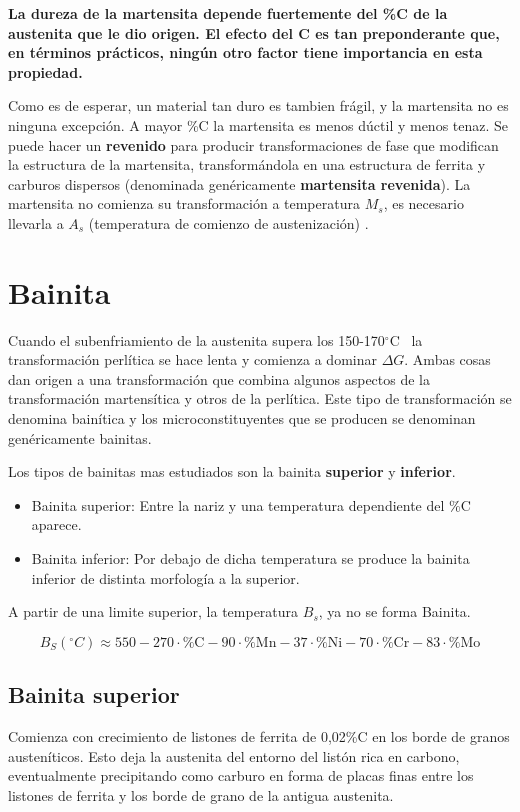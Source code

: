 \documentclass{article}
\newcommand{\grad}{\ensuremath{^\circ \mathrm{C}}}
\begin{document}
\textbf{La dureza de la martensita depende fuertemente del \%C de la austenita que le dio origen. El efecto del C es tan preponderante que, en términos prácticos, ningún otro factor tiene importancia en esta propiedad.}

Como es de esperar, un material tan duro es tambien frágil, y la martensita no es ninguna excepción. A mayor \%C la martensita es menos dúctil y menos tenaz. Se puede hacer un \textbf{revenido} para producir transformaciones de fase que modifican la estructura de la martensita, transformándola en una estructura de ferrita y carburos dispersos (denominada genéricamente \textbf{martensita revenida}). La martensita no comienza su transformación a temperatura $M_s$, es necesario llevarla a $A_s$ (temperatura de comienzo de austenización) \cite{gottstein2013physical}.

\section{Bainita}

Cuando el subenfriamiento de la austenita supera los 150-170\grad~ la transformación perlítica se hace lenta y comienza a dominar $\Delta G$. Ambas cosas dan origen a una transformación que combina algunos aspectos de la transformación martensítica y otros de la perlítica. Este tipo de transformación se denomina bainítica y los microconstituyentes que se producen se denominan genéricamente bainitas.

Los tipos de bainitas mas estudiados son la bainita \textbf{superior} y \textbf{inferior}.

\begin{itemize}
    \item Bainita superior: Entre la nariz y una temperatura dependiente del \%C aparece.
    \item Bainita inferior: Por debajo de dicha temperatura se produce la bainita inferior de distinta morfología a la superior.
\end{itemize}

A partir de una limite superior, la temperatura $B_s$, ya no se forma Bainita.

\[
B_{S}\left(^{\circ} C\right)\approx550-270 \cdot\%\mathrm{C}-90\cdot\%\mathrm{Mn}-37 \cdot\%\mathrm{Ni}-70 \cdot\%\mathrm{Cr}-83\cdot\%\mathrm{Mo}
\]

\subsection{Bainita superior}
Comienza con crecimiento de listones de ferrita de 0,02\%C en los borde de granos austeníticos. Esto deja la austenita del entorno del listón rica en carbono, eventualmente precipitando como carburo en forma de placas finas entre los listones de ferrita y los borde de grano de la antigua austenita.
\end{document}
